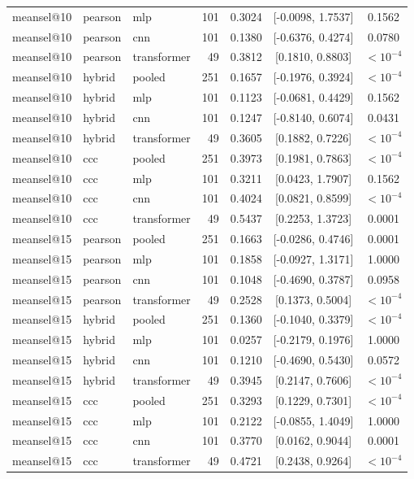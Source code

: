 \begin{longtable}{lllrrcc}
meansel@10 & pearson & mlp & 101 & 0.3024 & [-0.0098, 1.7537] & 0.1562 \\
meansel@10 & pearson & cnn & 101 & 0.1380 & [-0.6376, 0.4274] & 0.0780 \\
meansel@10 & pearson & transformer & 49 & 0.3812 & [0.1810, 0.8803] & $<10^{-4}$ \\
meansel@10 & hybrid & pooled & 251 & 0.1657 & [-0.1976, 0.3924] & $<10^{-4}$ \\
meansel@10 & hybrid & mlp & 101 & 0.1123 & [-0.0681, 0.4429] & 0.1562 \\
meansel@10 & hybrid & cnn & 101 & 0.1247 & [-0.8140, 0.6074] & 0.0431 \\
meansel@10 & hybrid & transformer & 49 & 0.3605 & [0.1882, 0.7226] & $<10^{-4}$ \\
meansel@10 & ccc & pooled & 251 & 0.3973 & [0.1981, 0.7863] & $<10^{-4}$ \\
meansel@10 & ccc & mlp & 101 & 0.3211 & [0.0423, 1.7907] & 0.1562 \\
meansel@10 & ccc & cnn & 101 & 0.4024 & [0.0821, 0.8599] & $<10^{-4}$ \\
meansel@10 & ccc & transformer & 49 & 0.5437 & [0.2253, 1.3723] & 0.0001 \\
meansel@15 & pearson & pooled & 251 & 0.1663 & [-0.0286, 0.4746] & 0.0001 \\
meansel@15 & pearson & mlp & 101 & 0.1858 & [-0.0927, 1.3171] & 1.0000 \\
meansel@15 & pearson & cnn & 101 & 0.1048 & [-0.4690, 0.3787] & 0.0958 \\
meansel@15 & pearson & transformer & 49 & 0.2528 & [0.1373, 0.5004] & $<10^{-4}$ \\
meansel@15 & hybrid & pooled & 251 & 0.1360 & [-0.1040, 0.3379] & $<10^{-4}$ \\
meansel@15 & hybrid & mlp & 101 & 0.0257 & [-0.2179, 0.1976] & 1.0000 \\
meansel@15 & hybrid & cnn & 101 & 0.1210 & [-0.4690, 0.5430] & 0.0572 \\
meansel@15 & hybrid & transformer & 49 & 0.3945 & [0.2147, 0.7606] & $<10^{-4}$ \\
meansel@15 & ccc & pooled & 251 & 0.3293 & [0.1229, 0.7301] & $<10^{-4}$ \\
meansel@15 & ccc & mlp & 101 & 0.2122 & [-0.0855, 1.4049] & 1.0000 \\
meansel@15 & ccc & cnn & 101 & 0.3770 & [0.0162, 0.9044] & 0.0001 \\
meansel@15 & ccc & transformer & 49 & 0.4721 & [0.2438, 0.9264] & $<10^{-4}$ \\

\end{longtable}
